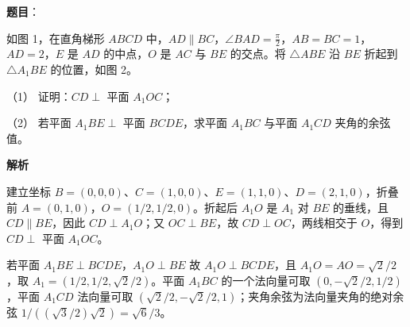 \begin{answer}

\textbf{题目}：

如图 1，在直角梯形 $ABCD$ 中，$AD\parallel BC$，$\angle BAD=\frac\pi2$，$AB=BC=1$，$AD=2$，$E$ 是 $AD$ 的中点，$O$ 是 $AC$ 与 $BE$ 的交点。将 $\triangle ABE$ 沿 $BE$ 折起到 $\triangle A_1BE$ 的位置，如图 2。

（1） 证明：$CD\perp$ 平面 $A_1OC$；

（2） 若平面 $A_1BE\perp$ 平面 $BCDE$，求平面 $A_1BC$ 与平面 $A_1CD$ 夹角的余弦值。
\nopagebreak[4]
\begin{center}\end{center}
\nopagebreak[4]
\textbf{解析}


建立坐标 $B=(0,0,0)$、$C=(1,0,0)$、$E=(1,1,0)$、$D=(2,1,0)$，折叠前 $A=(0,1,0)$，$O=(1/2,1/2,0)$。折起后 $A_1O$ 是 $A_1$ 对 $BE$ 的垂线，且 $CD\parallel BE$，因此 $CD\perp A_1O$；又 $OC\perp BE$，故 $CD\perp OC$，两线相交于 $O$，得到 $CD\perp$ 平面 $A_1OC$。


若平面 $A_1BE\perp BCDE$，$A_1O\perp BE$ 故 $A_1O\perp BCDE$，且 $A_1O=AO=\sqrt2/2$，取 $A_1=(1/2,1/2,\sqrt2/2)$。平面 $A_1BC$ 的一个法向量可取 $(0,-\sqrt2/2,1/2)$，平面 $A_1CD$ 法向量可取 $(\sqrt2/2,-\sqrt2/2,1)$；夹角余弦为法向量夹角的绝对余弦 $1/((\sqrt3/2)\sqrt2)=\sqrt6/3$。



\end{answer}
